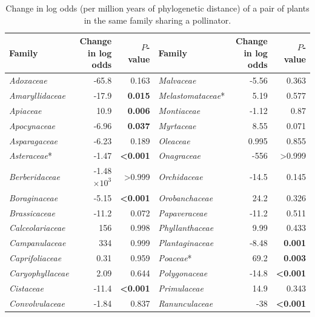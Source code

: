 \documentclass[12pt]{article}
\begin{document}
  \begin{table}[!h]
  \caption{
  \small Change in log odds (per million years of phylogenetic distance) of a pair of plants in the same family sharing a pollinator.}
  \small
  \label{family_slopes_pp}
  \begin{tabular}{|l  rr|| l rr|}
    \hline
    Family  & Change in log odds & $P$-value & Family  & Change in log odds & $P$-value \\
    \hline
    \emph{Adoxaceae}  & -65.8 & 0.163 & \emph{Malvaceae}  & -5.56 & 0.363 \\
    \emph{Amaryllidaceae} & -17.9 & \textbf{0.015}  & \emph{Melastomataceae}* & 5.19  & 0.577 \\
    \emph{Apiaceae} & 10.9  & \textbf{0.006}  & \emph{Montiaceae} & -1.12 & 0.87  \\
    \emph{Apocynaceae}  & -6.96 & \textbf{0.037}  & \emph{Myrtaceae}  & 8.55  & 0.071 \\
    \emph{Asparagaceae} & -6.23 & 0.189 & \emph{Oleaceae} & 0.995 & 0.855 \\
    \emph{Asteraceae}*  & -1.47 & \textbf{\textless0.001} & \emph{Onagraceae} & -556  & \textgreater0.999 \\
    \emph{Berberidaceae}  & -1.48$\times10^3$ & \textgreater0.999 & \emph{Orchidaceae}  & -14.5 & 0.145 \\
    \emph{Boraginaceae} & -5.15 & \textbf{\textless0.001} & \emph{Orobanchaceae}  & 24.2  & 0.326 \\
    \emph{Brassicaceae} & -11.2 & 0.072 & \emph{Papaveraceae} & -11.2 & 0.511 \\
    \emph{Calceolariaceae}  & 156 & 0.998 & \emph{Phyllanthaceae} & 9.99  & 0.433 \\
    \emph{Campanulaceae}  & 334 & 0.999 & \emph{Plantaginaceae} & -8.48 & \textbf{0.001}  \\
    \emph{Caprifoliaceae} & 0.31  & 0.959 & \emph{Poaceae}* & 69.2  & \textbf{0.003}  \\
    \emph{Caryophyllaceae}  & 2.09  & 0.644 & \emph{Polygonaceae} & -14.8 & \textbf{\textless0.001} \\
    \emph{Cistaceae}  & -11.4 & \textbf{\textless0.001} & \emph{Primulaceae}  & 14.9  & 0.343 \\
    \emph{Convolvulaceae} & -1.84 & 0.837 & \emph{Ranunculaceae}  & -38 & \textbf{\textless0.001} \\

\end{tabular}
\end{table}
\end{document}
